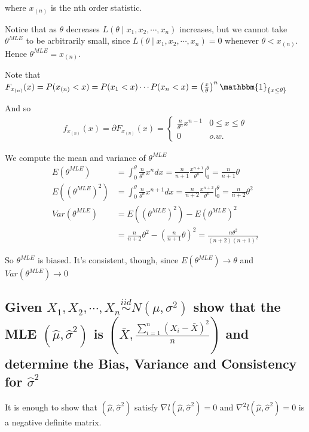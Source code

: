 \documentclass[paper=a4, fontsize=11pt]{scrartcl} %
\numberwithin{equation}{section} %
\numberwithin{figure}{section} %
\numberwithin{table}{section} %
\begin{document}
where $x_{(n)}$ is the nth order statistic. 

Notice that as $\theta$ decreases $L(\theta \mid x_1, x_2, \cdots, x_n)$ increases, but we cannot take $\theta^{MLE}$ to be arbitrarily small, since $L(\theta \mid x_1, x_2, \cdots, x_n) = 0$ whenever $\theta < x_{(n)}$. Hence $\theta^{MLE} = x_{(n)}$.
\newline

Note that $F_{x_{(n)}}(x) = P(x_{(n)}<x)=P(x_{1}<x)\cdots P(x_{n}<x)=\left(\frac{x}{\theta}\right)^n\mathbbm{1}_{\{x \le \theta\}}$
\newline

And so 
\begin{align*}
f_{x_{(n)}}(x) = \partial F_{x_{(n)}}(x) = \begin{cases} 
\frac{n}{\theta^n}x^{n-1} & 0 \le x\le \theta \\
 0                         & o.w.
						   \end{cases}
\end{align*}



We compute the mean and variance of $\theta^{MLE}$
\begin{align*}
E(\theta^{MLE})&=\int_{0}^{\theta}\frac{n}{\theta^n}x^{n}dx= \frac{n}{n+1}\frac{x^{n+1}}{\theta^n}\big|_{0}^{\theta}=\frac{n}{n+1}\theta \\
E((\theta^{MLE})^2)&= \int_{0}^{\theta}\frac{n}{\theta^n}x^{n+1}dx= \frac{n}{n+2}\frac{x^{n+2}}{\theta^n}\big|_{0}^{\theta}=\frac{n}{n+2}\theta^2 \\
Var(\theta^{MLE})&= E((\theta^{MLE})^2) - E(\theta^{MLE})^2 \\
&= \frac{n}{n+2}\theta^2 - \left(\frac{n}{n+1}\theta\right)^2 = \frac{n\theta^2}{(n+2)(n+1)^2}
\end{align*}

So $\theta^{MLE}$ is biased. It's consistent, though, since $E(\theta^{MLE}) \rightarrow \theta$ and 
$Var(\theta^{MLE}) \rightarrow 0$

\subsection{Given $X_1, X_2, \cdots, X_n \overset{iid}{\sim} N(\mu, \sigma^2)$ show that the MLE $(\hat{\mu}, \hat{\sigma}^2)$ is $\left(\bar{X}, \frac{\sum_{i=1}^n(X_i-\bar{X})^2}{n}\right)$ and determine the Bias, Variance and Consistency for $\hat{\sigma}^2$}

It is enough to show that $(\hat{\mu}, \hat{\sigma}^2)$ satisfy $\nabla l(\hat{\mu}, \hat{\sigma}^2)=0$
and $\nabla^2 l(\hat{\mu}, \hat{\sigma}^2)=0$ is a negative definite matrix. 
\end{document}
